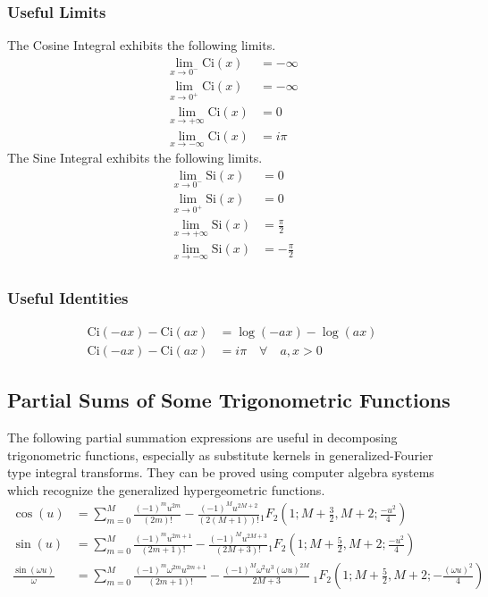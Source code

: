 \subsubsection{Useful Limits}
The Cosine Integral exhibits the following limits.
\begin{align}
	\lim_{x \to 0^-} \mathrm{Ci}(x) &= -\infty \\
	\lim_{x \to 0^+} \mathrm{Ci}(x) &= -\infty \\
	\lim_{x \to +\infty} \mathrm{Ci}(x) &= 0 \\
	\lim_{x \to -\infty} \mathrm{Ci}(x) &= i\pi
\end{align}
The Sine Integral exhibits the following limits.
\begin{align}
	\lim_{x \to 0^-} \mathrm{Si}(x) &= 0 \\
	\lim_{x \to 0^+} \mathrm{Si}(x) &= 0 \\
	\lim_{x \to +\infty} \mathrm{Si}(x) &= \frac{\pi}{2} \\
	\lim_{x \to -\infty} \mathrm{Si}(x) &= -\frac{\pi}{2} \\
\end{align}
\subsubsection{Useful Identities}
\begin{align}
	\mathrm{Ci}(-ax) - \mathrm{Ci}(ax) &= \log(-a x) - \log(a x) \\
	\mathrm{Ci}(-ax) - \mathrm{Ci}(ax) &= i\pi \quad \forall \quad a,x > 0
\end{align}


\subsection{Partial Sums of Some Trigonometric Functions}

The following partial summation expressions are useful in decomposing trigonometric functions, especially as substitute kernels in generalized-Fourier type integral transforms.  They can be proved using computer algebra systems which recognize the generalized hypergeometric functions.
\begin{align}
	\cos(u) &=
	    \sum_{m=0}^{M} \frac{(-1)^m u^{2m}}{(2m)!}
	    - \frac{(-1)^M u^{2M+2}}{(2(M+1))!}
	    {}_{1}F_{2}\left(1; M+\frac{3}{2}, M+2; \frac{-u^2}{4}\right) \\
	\sin(u) &=
	    \sum_{m=0}^{M} \frac{(-1)^m u^{2m + 1}}{(2m + 1)!}
	    - \frac{(-1)^M u^{2M+3}}{(2M+3)!}
	{}_{1}F_{2}\left(1; M+\frac{5}{2}, M+2; \frac{-u^2}{4}\right) \\
	\frac{\sin(\omega u)}{\omega} &= 
	    \sum_{m=0}^M \frac{(-1)^m \omega^{2m} u^{2m+1}}{(2m + 1)!}
	    - \frac{(-1)^M \omega^2 u^3 (\omega u)^{2M}}{2M + 3}
	    \ {}_{1}F_{2}\left(1; M+\frac{5}{2}, M+2; -\frac{(\omega u)^2}{4}\right)
\end{align}

